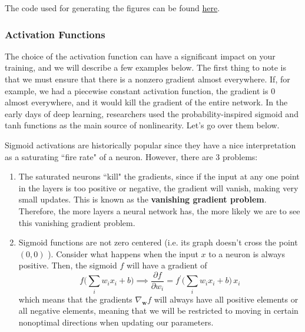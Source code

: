 \documentclass{article}
\begin{document}
    \begin{code} 
      The code used for generating the figures can be found \href{code/initialization.ipynb}{here}. 
    \end{code}
    
  \subsubsection{Activation Functions} 

    The choice of the activation function can have a significant impact on your training, and we will describe a few examples below. The first thing to note is that we must ensure that there is a nonzero gradient almost everywhere. If, for example, we had a piecewise constant activation function, the gradient is $0$ almost everywhere, and it would kill the gradient of the entire network. In the early days of deep learning, researchers used the probability-inspired sigmoid and tanh functions as the main source of nonlinearity. Let's go over them below. 

    \begin{definition}[Sigmoid]
      Sigmoid activations are historically popular since they have a nice interpretation as a saturating ``fire rate" of a neuron. However, there are 3 problems: 
      \begin{enumerate}
        \item The saturated neurons ``kill" the gradients, since if the input at any one point in the layers is too positive or negative, the gradient will vanish, making very small updates. This is known as the \textbf{vanishing gradient problem}. Therefore, the more layers a neural network has, the more likely we are to see this vanishing gradient problem. 
        \item Sigmoid functions are not zero centered (i.e. its graph doesn't cross the point $(0, 0)$ ). Consider what happens when the input $x$ to a neuron is always positive. Then, the sigmoid $f$ will have a gradient of 
        \begin{equation}
          f \bigg( \sum_i w_i x_i + b \bigg) \implies \frac{\partial f}{\partial w_i} = f^\prime \bigg( \sum_i w_i x_i + b \bigg)\, x_i
        \end{equation}
        which means that the gradients $\nabla_\mathbf{w} f$ will always have all positive elements or all negative elements, meaning that we will be restricted to moving in certain nonoptimal directions when updating our parameters. 
      \end{enumerate}
    \end{definition} 
\end{document}
